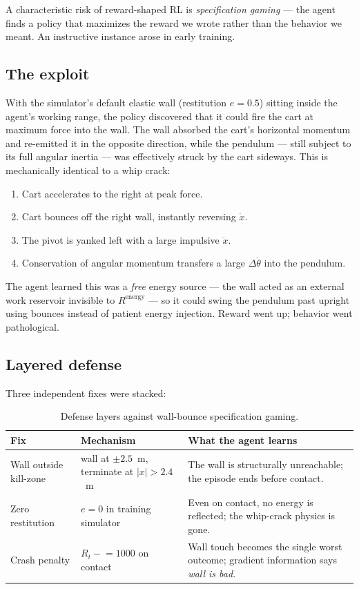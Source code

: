 \documentclass[11pt,a4paper]{article}
\begin{document}
A characteristic risk of reward-shaped RL is \emph{specification gaming} ---
the agent finds a policy that maximizes the reward we wrote rather than the
behavior we meant. An instructive instance arose in early training.

\subsection{The exploit}
With the simulator's default elastic wall (restitution $e = 0.5$) sitting inside the agent's working range, the policy discovered that it could fire the cart at maximum force into the wall. The wall absorbed the cart's horizontal momentum and re-emitted it in the opposite direction, while the pendulum --- still subject to its full angular inertia --- was effectively struck by the cart sideways. This is mechanically identical to a whip crack:
\begin{enumerate}[leftmargin=*]
    \item Cart accelerates to the right at peak force.
    \item Cart bounces off the right wall, instantly reversing $\dot{x}$.
    \item The pivot is yanked left with a large impulsive $\ddot{x}$.
    \item Conservation of angular momentum transfers a large $\Delta\dot\theta$ into the pendulum.
\end{enumerate}
The agent learned this was a \emph{free} energy source --- the wall acted as an external work reservoir invisible to $R^{\text{energy}}$ --- so it could swing the pendulum past upright using bounces instead of patient energy injection. Reward went up; behavior went pathological.

\subsection{Layered defense}
Three independent fixes were stacked:
\begin{table}[h]
\centering
\caption{Defense layers against wall-bounce specification gaming.}
\label{tab:wallfix}
\begin{tabularx}{\linewidth}{l l X}
\toprule
\textbf{Fix} & \textbf{Mechanism} & \textbf{What the agent learns} \\
\midrule
Wall outside kill-zone & wall at $\pm 2.5$~m, terminate at $|x|>2.4$~m
                       & The wall is structurally unreachable; the episode ends before contact. \\
Zero restitution       & $e = 0$ in training simulator
                       & Even on contact, no energy is reflected; the whip-crack physics is gone. \\
Crash penalty          & $R_t \mathrel{-}= 1000$ on contact
                       & Wall touch becomes the single worst outcome; gradient information says \emph{wall is bad}. \\
\bottomrule
\end{tabularx}
\end{table}
\end{document}
